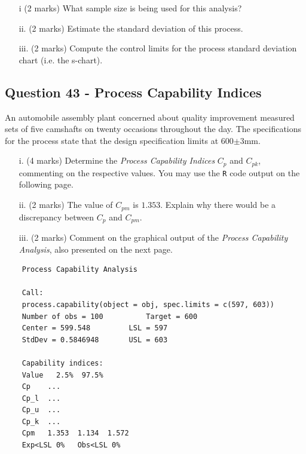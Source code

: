 \documentclass[a4paper,12pt]{article}
\begin{document}
\begin{itemize}
	\item[i] (2 marks) What sample size is being used for this analysis?
	\item[ii.] (2 marks) Estimate the standard deviation of this process.
	\item[iii.] (2 marks) Compute the control limits for the process standard deviation chart (i.e. the s-chart).
\end{itemize}

\subsection*{Question 43 - Process Capability Indices} 

An automobile assembly plant concerned about quality improvement measured sets of five camshafts on twenty occasions throughout the day. The specifications for the process state that the design specification limits at 600$\pm$3mm.


\begin{itemize}
	\item[i.] (4 marks) Determine the \emph{Process Capability Indices} $C_p$ and $C_{pk}$, commenting on the respective values. You may use the \texttt{R} code output on the following page.
	\item[ii.] (2 marks)  The value of $C_{pm}$ is $1.353$. Explain why there would be a discrepancy between $C_p$ and $C_{pm}$.
	\item[iii.] (2 marks) Comment on the graphical output of the \emph{Process Capability Analysis}, also presented on the next page.
\end{itemize}


\newpage
\begin{framed}
	\begin{verbatim}
	Process Capability Analysis
	
	Call:
	process.capability(object = obj, spec.limits = c(597, 603))
	Number of obs = 100          Target = 600
	Center = 599.548         LSL = 597
	StdDev = 0.5846948       USL = 603
	
	Capability indices:
	Value   2.5%  97.5%
	Cp    ...
	Cp_l  ...
	Cp_u  ...
	Cp_k  ...
	Cpm   1.353  1.134  1.572
	Exp<LSL 0%   Obs<LSL 0%
	\end{verbatim}
\end{framed}
\end{document}
